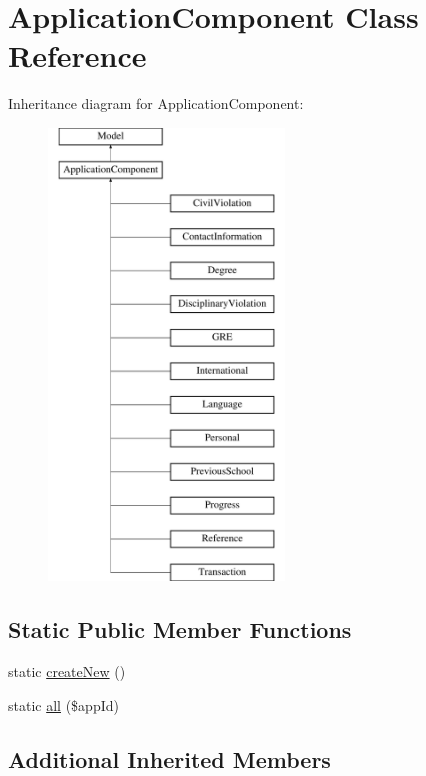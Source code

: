 \hypertarget{class_application_component}{\section{Application\-Component Class Reference}
\label{class_application_component}
}
Inheritance diagram for Application\-Component\-:\begin{figure}[H]
\begin{center}
\leavevmode
\includegraphics[height=12.000000cm]{class_application_component}
\end{center}
\end{figure}
\subsection*{Static Public Member Functions}
\begin{DoxyCompactItemize}
\item 
static \hyperlink{class_application_component_a5ca68f18b530016959aaec934272320f}{create\-New} ()
\item 
static \hyperlink{class_application_component_a01a70ef62f6db9c5700ad70447617ad2}{all} (\$app\-Id)
\end{DoxyCompactItemize}
\subsection*{Additional Inherited Members}


